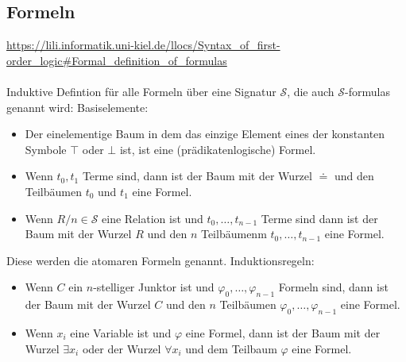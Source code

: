 \documentclass{article}
\begin{document}
    \subsection{Formeln}
    \url{https://lili.informatik.uni-kiel.de/llocs/Syntax_of_first-order_logic#Formal_definition_of_formulas}\\\\
    Induktive Defintion für alle Formeln über eine Signatur $\mathcal{S}$, die auch $\mathcal{S}$-formulas genannt wird:
    Basiselemente:\\
    \begin{itemize}
        \item Der einelementige Baum in dem das einzige Element eines der konstanten Symbole $\top$ oder $\bot$ ist, ist eine (prädikatenlogische) Formel.
        \item Wenn $t_0,t_1$ Terme sind, dann ist der Baum mit der Wurzel $\doteq$ und den Teilbäumen $t_0$ und $t_1$ eine Formel.
        \item Wenn $R/n \in \mathcal S$ eine Relation ist und $t_0,\dots,t_{n-1}$ Terme sind dann ist der Baum mit der Wurzel $R$ und den $n$ Teilbäumenm $t_0, \dots, t_{n-1}$ eine Formel.
    \end{itemize}
    Diese werden die atomaren Formeln genannt.
    Induktionsregeln:\\
    \begin{itemize}
        \item Wenn $C$ ein $n$-stelliger Junktor ist und $\varphi_0,\dots,\varphi_{n-1}$ Formeln sind, dann ist der Baum mit der Wurzel $C$ und den $n$ Teilbäumen $\varphi_0,\dots,\varphi_{n-1}$ eine Formel.
        \item Wenn $x_i$ eine Variable ist und $\varphi$ eine Formel, dann ist der Baum mit der Wurzel $\exists x_i$ oder der Wurzel $\forall x_i$ und dem Teilbaum $\varphi$ eine Formel.
    \end{itemize}
\end{document}
